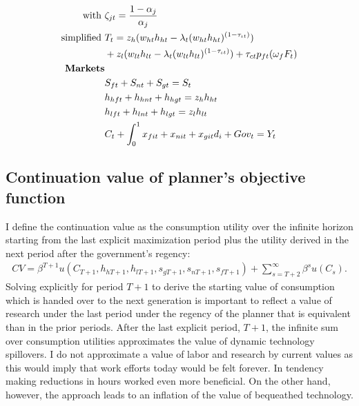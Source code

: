 \begin{align*}
\text{with}\ \vspace{4mm}&\zeta_{jt}=\frac{1-\alpha_j}{\alpha_j} \\
\text{simplified}\ \vspace{4mm} & T_t= z_h(w_{ht}h_{ht}-\lambda_t(w_{ht}h_{ht})^{(1-\tau_{\iota t})})\\&+z_l(w_{lt}h_{lt}-\lambda_t(w_{lt}h_{lt})^{(1-\tau_{\iota t})})+\tau_{ct}p_{ft}(\omega_fF_t) \\
\text{\textbf{Markets}}&\\
& S_{ft}+ S_{nt}+ S_{gt}=S_t\\
&h_{hft}+h_{hnt}+h_{hgt}=z_{h} h_{ht}\\
&h_{lft}+h_{lnt}+h_{lgt}=z_{l} h_{lt}\\
&C_{t}+\int_{0}^{1} x_{fit}+x_{nit}+x_{git}d_i+Gov_t=Y_t
\end{align*}

\subsection{Continuation value of planner's objective function}\label{app:PV}
I define the continuation value as the consumption utility over the infinite horizon starting from the last explicit maximization period plus the utility derived in the next period after the government's regency:
\begin{align}
CV=\beta^{T+1} u(C_{T+1},h_{h{T+1}}, h_{l{T+1}}, s_{g{T+1}}, s_{n{T+1}}, s_{f{T+1}})+\sum_{s=T+2}^{\infty} \beta^{s}u(C_s). %
\end{align}
Solving explicitly for period $T+1$ to derive the starting value of consumption which is handed over to the next generation is important to reflect a value of research under the last period under the regency of the planner that is equivalent than in the prior periods.
After the last explicit period, $T+1$, the infinite sum over consumption utilities approximates the value of dynamic technology spillovers. 
I do not approximate a value of labor and research by current values as this would imply that work efforts today would be felt forever. In tendency making reductions in hours worked even more beneficial. On the other hand, however, the approach leads to an inflation of the value of bequeathed technology. 

